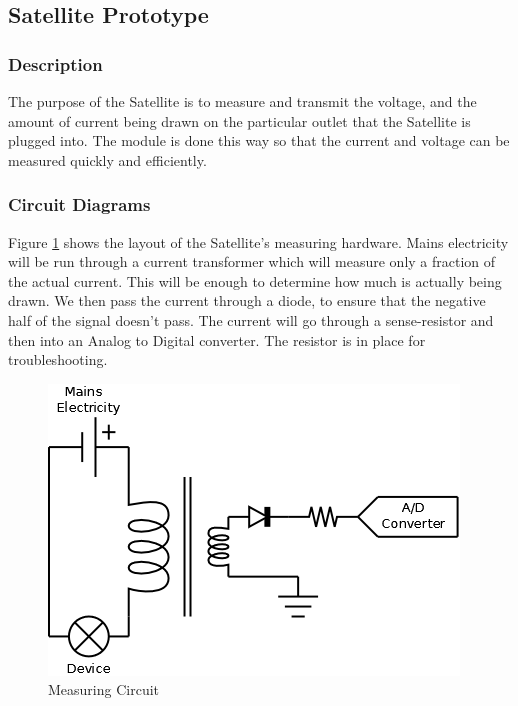 
\subsection{Satellite Prototype}

\subsubsection{Description}

The purpose of the Satellite is to measure and transmit the voltage,
and the amount of current being drawn on the particular outlet that 
the Satellite is plugged into. The module is done this way so that
the current and voltage can be measured quickly and efficiently.


\subsubsection{Circuit Diagrams}

Figure \ref{MeasuringCircuit} shows the layout of the Satellite's 
measuring hardware. Mains electricity will be run through a current
transformer which will measure only a fraction of the actual current. 
This will be enough to determine how much is actually being drawn. 
We then pass the current through a diode, to ensure that the negative half of the signal doesn't pass. 
The current will go through a sense-resistor and then into an Analog to Digital converter. 
The resistor is in place for troubleshooting. 

\begin{figure}[H]
\centering
\includegraphics[scale=0.3]{Hardware/images/MeasureCircuit.png}
\caption{Measuring Circuit}
\label{MeasuringCircuit}
\end{figure}

